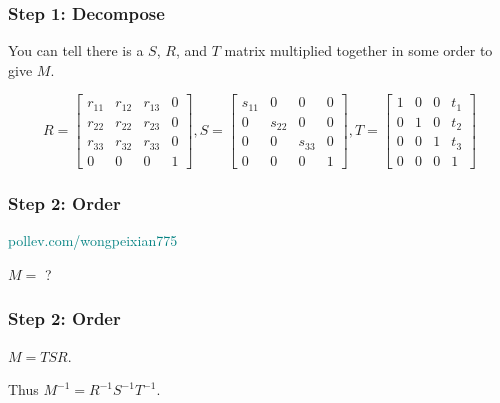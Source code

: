 \documentclass{beamer}
\begin{document}
\begin{frame}
    \frametitle{Step 1: Decompose}

    You can tell there is a $S$, $R$, and $T$ matrix multiplied together in some order to give $M$.

    $$ R = 
    \left[
    \begin{matrix}
        r_{11} & r_{12} & r_{13} & 0\\
        r_{22} & r_{22} & r_{23} & 0\\
        r_{33} & r_{32} & r_{33} & 0\\
        0 & 0 & 0 & 1
    \end{matrix}
    \right],
    S =
    \left[
    \begin{matrix}
        s_{11} & 0 & 0 & 0\\
        0 & s_{22} & 0 & 0\\
        0 & 0 & s_{33} & 0\\
        0 & 0 & 0 & 1
    \end{matrix}
    \right],
    T =
    \left[
    \begin{matrix}
        1 & 0 & 0 & t_1\\
        0 & 1 & 0 & t_2\\
        0 & 0 & 1 & t_3\\
        0 & 0 & 0 & 1
    \end{matrix}
    \right]
    $$

\end{frame}

\begin{frame}
    \frametitle{Step 2: Order}

    \begin{tcolorbox}[colback=teal!5!white]
        \textcolor{teal}{pollev.com/wongpeixian775}
    \end{tcolorbox}
    
    $M =$ ?

\end{frame}

\begin{frame}
    \frametitle{Step 2: Order}

    $M = TSR$.

    \vspace{1em}

    Thus $M^{-1} = R^{-1} S^{-1} T^{-1}$.

\end{frame}
\end{document}
